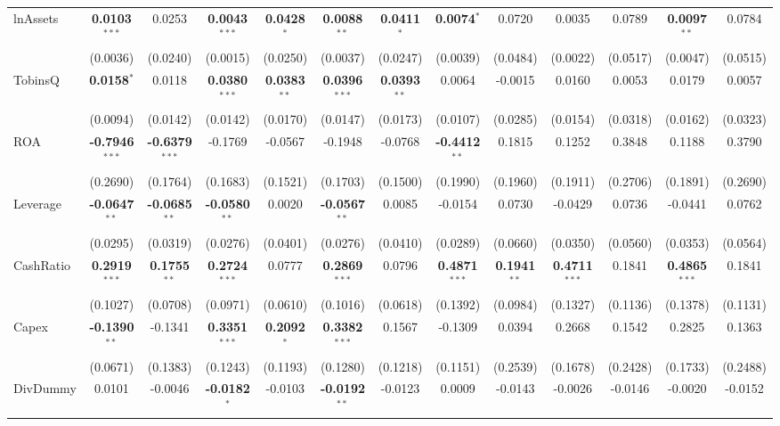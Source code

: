 \documentclass[11pt,a4paper]{article}
\begin{document}
\begin{table}[htbp]
\begin{tabular}{lcccccccccccc}
\midrule
lnAssets & \textbf{0.0103}$^{***}$ & 0.0253 & \textbf{0.0043}$^{***}$ & \textbf{0.0428}$^{*}$ & \textbf{0.0088}$^{**}$ & \textbf{0.0411}$^{*}$ & \textbf{0.0074}$^{*}$ & 0.0720 & 0.0035 & 0.0789 & \textbf{0.0097}$^{**}$ & 0.0784 \\
 & (0.0036) & (0.0240) & (0.0015) & (0.0250) & (0.0037) & (0.0247) & (0.0039) & (0.0484) & (0.0022) & (0.0517) & (0.0047) & (0.0515) \\
TobinsQ & \textbf{0.0158}$^{*}$ & 0.0118 & \textbf{0.0380}$^{***}$ & \textbf{0.0383}$^{**}$ & \textbf{0.0396}$^{***}$ & \textbf{0.0393}$^{**}$ & 0.0064 & -0.0015 & 0.0160 & 0.0053 & 0.0179 & 0.0057 \\
 & (0.0094) & (0.0142) & (0.0142) & (0.0170) & (0.0147) & (0.0173) & (0.0107) & (0.0285) & (0.0154) & (0.0318) & (0.0162) & (0.0323) \\
ROA & \textbf{-0.7946}$^{***}$ & \textbf{-0.6379}$^{***}$ & -0.1769 & -0.0567 & -0.1948 & -0.0768 & \textbf{-0.4412}$^{**}$ & 0.1815 & 0.1252 & 0.3848 & 0.1188 & 0.3790 \\
 & (0.2690) & (0.1764) & (0.1683) & (0.1521) & (0.1703) & (0.1500) & (0.1990) & (0.1960) & (0.1911) & (0.2706) & (0.1891) & (0.2690) \\
Leverage & \textbf{-0.0647}$^{**}$ & \textbf{-0.0685}$^{**}$ & \textbf{-0.0580}$^{**}$ & 0.0020 & \textbf{-0.0567}$^{**}$ & 0.0085 & -0.0154 & 0.0730 & -0.0429 & 0.0736 & -0.0441 & 0.0762 \\
 & (0.0295) & (0.0319) & (0.0276) & (0.0401) & (0.0276) & (0.0410) & (0.0289) & (0.0660) & (0.0350) & (0.0560) & (0.0353) & (0.0564) \\
CashRatio & \textbf{0.2919}$^{***}$ & \textbf{0.1755}$^{**}$ & \textbf{0.2724}$^{***}$ & 0.0777 & \textbf{0.2869}$^{***}$ & 0.0796 & \textbf{0.4871}$^{***}$ & \textbf{0.1941}$^{**}$ & \textbf{0.4711}$^{***}$ & 0.1841 & \textbf{0.4865}$^{***}$ & 0.1841 \\
 & (0.1027) & (0.0708) & (0.0971) & (0.0610) & (0.1016) & (0.0618) & (0.1392) & (0.0984) & (0.1327) & (0.1136) & (0.1378) & (0.1131) \\
Capex & \textbf{-0.1390}$^{**}$ & -0.1341 & \textbf{0.3351}$^{***}$ & \textbf{0.2092}$^{*}$ & \textbf{0.3382}$^{***}$ & 0.1567 & -0.1309 & 0.0394 & 0.2668 & 0.1542 & 0.2825 & 0.1363 \\
 & (0.0671) & (0.1383) & (0.1243) & (0.1193) & (0.1280) & (0.1218) & (0.1151) & (0.2539) & (0.1678) & (0.2428) & (0.1733) & (0.2488) \\
DivDummy & 0.0101 & -0.0046 & \textbf{-0.0182}$^{*}$ & -0.0103 & \textbf{-0.0192}$^{**}$ & -0.0123 & 0.0009 & -0.0143 & -0.0026 & -0.0146 & -0.0020 & -0.0152 \\

\end{tabular}
\end{table}
\end{document}
